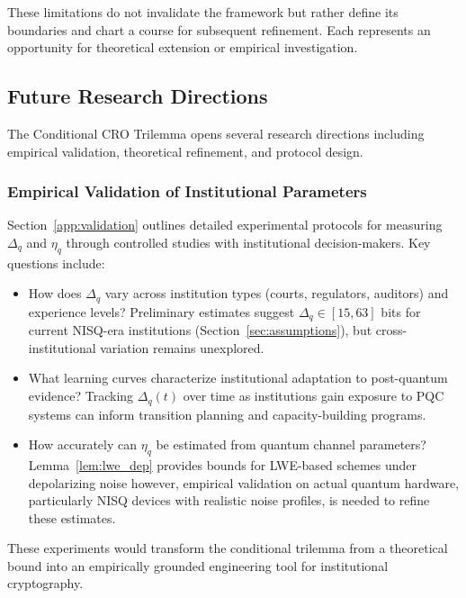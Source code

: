 \documentclass{ieeeaccess}
\begin{document}
These limitations do not invalidate the framework but rather define its boundaries 
and chart a course for subsequent refinement. Each represents an opportunity for 
theoretical extension or empirical investigation.

\subsection{Future Research Directions}

The Conditional CRO Trilemma opens several research directions including empirical 
validation, theoretical refinement, and protocol design.

\subsubsection{Empirical Validation of Institutional Parameters}

Section~\ref{app:validation} outlines detailed experimental protocols for measuring 
$\Delta_q$ and $\eta_q$ through controlled studies with institutional decision-makers. 
Key questions include:

\begin{itemize}
    \item How does $\Delta_q$ vary across institution types (courts, regulators, 
    auditors) and experience levels? Preliminary estimates suggest $\Delta_q \in [15,63]$ 
    bits for current NISQ-era institutions (Section~\ref{sec:assumptions}), but 
    cross-institutional variation remains unexplored.
    
    \item What learning curves characterize institutional adaptation to post-quantum 
    evidence? Tracking $\Delta_q(t)$ over time as institutions gain exposure to PQC 
    systems can inform transition planning and capacity-building programs.
    
    \item How accurately can $\eta_q$ be estimated from quantum channel parameters? 
    Lemma~\ref{lem:lwe_dep} provides bounds for LWE-based schemes under depolarizing 
    noise however,  empirical validation on actual quantum hardware, particularly NISQ 
    devices with realistic noise profiles, is needed to refine these estimates.
\end{itemize}

These experiments would transform the conditional trilemma from a theoretical 
bound into an empirically grounded engineering tool for institutional cryptography.
\end{document}
